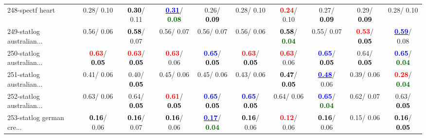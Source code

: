 \begin{table}[h]
\begin{center}
{\begin{tabular}{lc|c|c|c|c|c|c|c|c}
248-spectf heart &   0.28/  0.10 & \textcolor{black}{\textbf{  0.30}}/  0.11 & \underline{\textcolor{blue}{\textbf{  0.31}}}/\textcolor{darkgreen}{\textbf{  0.08}} &   0.26/\textcolor{black}{\textbf{  0.09}} &   0.28/  0.10 & \textcolor{red}{\textbf{  0.24}}/  0.10 &   0.27/\textcolor{black}{\textbf{  0.09}} &   0.29/\textcolor{black}{\textbf{  0.09}} &   0.28/  0.10 \\
249-statlog australian... &   0.56/  0.06 & \textcolor{black}{\textbf{  0.58}}/  0.07 &   0.56/  0.07 &   0.56/  0.07 &   0.56/  0.06 & \textcolor{black}{\textbf{  0.58}}/\textcolor{darkgreen}{\textbf{  0.04}} &   0.55/  0.07 & \textcolor{red}{\textbf{  0.53}}/\textcolor{black}{\textbf{  0.05}} & \underline{\textcolor{blue}{\textbf{  0.59}}}/  0.08 \\
250-statlog australian... & \textcolor{red}{\textbf{  0.63}}/\textcolor{black}{\textbf{  0.05}} & \textcolor{red}{\textbf{  0.63}}/\textcolor{black}{\textbf{  0.05}} & \textcolor{red}{\textbf{  0.63}}/  0.06 & \textcolor{blue}{\textbf{  0.65}}/\textcolor{black}{\textbf{  0.05}} & \textcolor{red}{\textbf{  0.63}}/\textcolor{black}{\textbf{  0.05}} & \textcolor{red}{\textbf{  0.63}}/  0.06 & \textcolor{blue}{\textbf{  0.65}}/\textcolor{black}{\textbf{  0.05}} &   0.64/\textcolor{black}{\textbf{  0.05}} & \textcolor{blue}{\textbf{  0.65}}/\textcolor{darkgreen}{\textbf{  0.04}} \\
251-statlog australian... &   0.41/  0.06 &   0.40/\textcolor{black}{\textbf{  0.05}} &   0.45/  0.06 &   0.45/  0.06 &   0.43/  0.06 & \textcolor{black}{\textbf{  0.47}}/\textcolor{black}{\textbf{  0.05}} & \underline{\textcolor{blue}{\textbf{  0.48}}}/  0.06 &   0.39/  0.06 & \textcolor{red}{\textbf{  0.28}}/\textcolor{darkgreen}{\textbf{  0.04}} \\
252-statlog australian... &   0.63/  0.06 &   0.64/\textcolor{black}{\textbf{  0.05}} & \textcolor{red}{\textbf{  0.61}}/\textcolor{black}{\textbf{  0.05}} & \textcolor{blue}{\textbf{  0.65}}/\textcolor{black}{\textbf{  0.05}} & \textcolor{blue}{\textbf{  0.65}}/\textcolor{black}{\textbf{  0.05}} &   0.64/  0.06 & \textcolor{blue}{\textbf{  0.65}}/\textcolor{darkgreen}{\textbf{  0.04}} &   0.62/  0.07 &   0.63/\textcolor{black}{\textbf{  0.05}} \\ \hline
253-statlog german cre... & \textcolor{black}{\textbf{  0.16}}/  0.06 & \textcolor{black}{\textbf{  0.16}}/  0.07 & \textcolor{black}{\textbf{  0.16}}/  0.06 & \underline{\textcolor{blue}{\textbf{  0.17}}}/\textcolor{darkgreen}{\textbf{  0.04}} & \textcolor{black}{\textbf{  0.16}}/  0.06 & \textcolor{red}{\textbf{  0.12}}/  0.06 & \textcolor{black}{\textbf{  0.16}}/  0.06 &   0.15/  0.06 & \textcolor{black}{\textbf{  0.16}}/\textcolor{black}{\textbf{  0.05}} \\

\end{tabular}}
\end{center}
\end{table}
